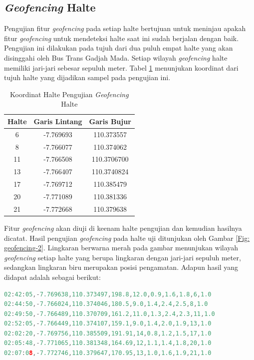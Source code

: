 \subsection{\textit{Geofencing} Halte}
Pengujian fitur \textit{geofencing} pada setiap halte bertujuan untuk meninjau apakah fitur \textit{geofencing} untuk mendeteksi halte saat ini sudah berjalan dengan baik. Pengujian ini dilakukan pada tujuh dari dua puluh empat halte yang akan disinggahi oleh Bus Trans Gadjah Mada. Setiap wilayah \textit{geofencing} halte memiliki jari-jari sebesar sepuluh meter. Tabel \ref{Tab: geofencing-2} menunjukan koordinat dari tujuh halte yang dijadikan sampel pada pengujian ini.

\begin{table}[H]
	\caption{Koordinat Halte Pengujian \textit{Geofencing} Halte}
	\vspace{0.5em}
	\centering
	\begin{tabular}{ccc}
		\hline
		\textbf{Halte} &\textbf{Garis Lintang} & \textbf{Garis Bujur} \\
		\hline 
		6 & -7.769693& 110.373557 \\
		8 &-7.766077&110.374062\\ 
		11 &-7.766508&110.3706700\\
		13 & -7.766407&110.3740824\\
		17 &-7.769712&110.385479\\ 
		20 & -7.771089&110.381336\\
		21 & -7.772668&110.379638\\
		\hline
	\end{tabular}
	\label{Tab: geofencing-2}
\end{table}

Fitur \textit{geofencing} akan diuji di keenam halte pengujian dan kemudian hasilnya dicatat. Hasil pengujian \textit{geofencing} pada halte uji ditunjukan oleh Gambar \ref{Fig: geofencing-2}. Lingkaran berwarna merah pada gambar menunjukan wilayah \textit{geofencing} setiap halte yang berupa lingkaran dengan jari-jari sepuluh meter, sedangkan lingkaran biru merupakan posisi pengamatan. Adapun hasil yang didapat adalah sebagai berikut:

\begin{lstlisting}[language=c]
02:42:05,-7.769638,110.373497,198.8,12.0,0.9,1.6,1.8,6,1.0
02:44:50,-7.766024,110.374046,180.5,9.0,1.4,2.4,2.5,8,1.0
02:49:50,-7.766489,110.370709,161.2,11.0,1.3,2.4,2.3,11,1.0
02:52:05,-7.766449,110.374107,159.1,9.0,1.4,2.0,1.9,13,1.0
02:02:20,-7.769756,110.385509,191.91,14,0.8,1.2,1.5,17,1.0
02:05:48,-7.771065,110.381348,164.69,12,1.1,1.4,1.8,20,1.0
02:07:08,-7.772746,110.379647,170.95,13,1.0,1.6,1.9,21,1.0
\end{lstlisting}

